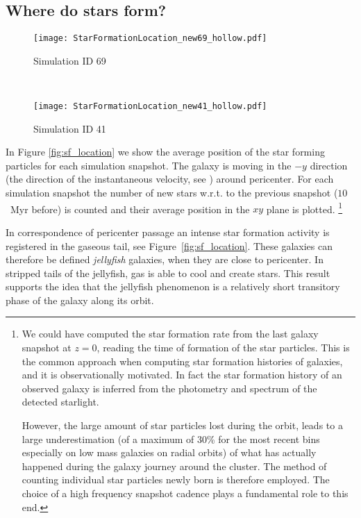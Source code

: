 \subsection{Where do stars form?}
\begin{figure*}
\centering
\begin{subfigure}[t]{0.74\textwidth}
\centering
\texttt{[image: StarFormationLocation\_new69\_hollow.pdf]}
\caption{Simulation ID 69}
\end{subfigure}\\[1.5ex]
\begin{subfigure}[t]{0.74\textwidth}
\centering
\texttt{[image: StarFormationLocation\_new41\_hollow.pdf]}
\caption{Simulation ID 41}
\end{subfigure}
\caption{Star formation location around first pericenter passage for simulation ID 69 and 41.
Each subpanel corresponds to a different pericenter.
The size of the marker is proportional to the number of stars born in that time interval.
Markers are colored according to the time from pericenter normalized with the radial period.}
\label{fig:sf_location}
\end{figure*}
In Figure \ref{fig:sf_location} we show the average position of the star forming particles for each simulation snapshot.
The galaxy is moving in the $-y$ direction (the direction of the instantaneous velocity, see ) around pericenter.
For each simulation snapshot the number of new stars w.r.t. to the previous snapshot ($10$~Myr before) is counted and their average position in the $xy$ plane is plotted.
\footnote{
We could have computed the star formation rate from the last galaxy snapshot at $z=0$, reading the time of formation of the star particles.
This is the common approach %
when computing star formation histories of galaxies, and it is observationally motivated.
In fact the star formation history of an observed galaxy is inferred from the photometry and spectrum of the detected starlight.

However, the large amount of star particles lost during the orbit, leads to a large underestimation (of a maximum of 30\% for the most recent bins especially on low mass galaxies on radial orbits) of what has actually happened during the galaxy journey around the cluster.
The method of counting individual star particles newly born is therefore employed.
The choice of a high frequency snapshot cadence plays a fundamental role to this end.
}

In correspondence of pericenter passage an intense star formation activity is registered in the gaseous tail, see Figure~\ref{fig:sf_location}.
These galaxies can therefore be defined \emph{jellyfish} galaxies, when they are close to pericenter.
In stripped tails of the jellyfish, gas is able to cool and create stars.
This result supports the idea that the jellyfish phenomenon is a relatively short transitory phase of the galaxy along its orbit.

